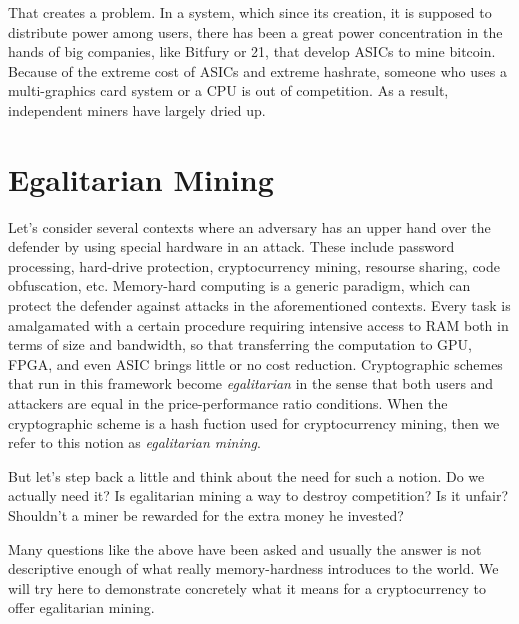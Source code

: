 That creates a problem. In a system, which since its creation, it is supposed to distribute power among users, there has been a great power concentration in the hands of big companies, like Bitfury or 21, that develop ASICs to mine bitcoin. Because of the extreme cost of ASICs and extreme hashrate, someone who uses a multi-graphics card system or a CPU is out of competition. As a result, independent miners have largely dried up.


%
\section{Egalitarian Mining}
Let's consider several contexts where an adversary has an upper hand over the defender by using special hardware in an attack. These include password processing, hard-drive protection, cryptocurrency mining, resourse sharing, code obfuscation, etc. Memory-hard computing is a generic paradigm, which can protect the defender against attacks in the aforementioned contexts. Every task is amalgamated with a certain procedure requiring intensive access to RAM both in terms of size and bandwidth, so that transferring the computation to GPU, FPGA, and even ASIC brings little or no cost reduction. Cryptographic schemes that run in this framework become \emph{egalitarian} in the sense that both users and attackers are equal in the price-performance ratio conditions. When the cryptographic scheme is a hash fuction used for cryptocurrency mining, then we refer to this notion as \emph{egalitarian mining}.

But let's step back a little and think about the need for such a notion. Do we actually need it? Is egalitarian mining a way to destroy competition? Is it unfair? Shouldn't a miner be rewarded for the extra money he invested?

Many questions like the above have been asked and usually the answer is not descriptive enough of what really memory-hardness introduces to the world. We will try here to demonstrate concretely what it means for a cryptocurrency to offer egalitarian mining.

